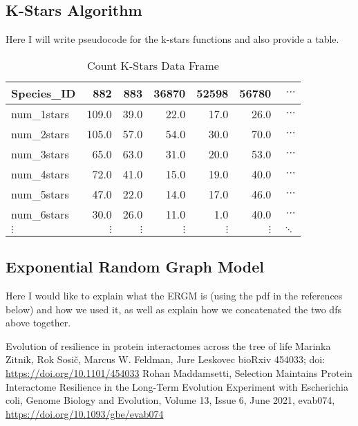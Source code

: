 \documentclass[12pt]{article}
\begin{document}
\subsection{K-Stars Algorithm}
Here I will write pseudocode for the k-stars functions and also provide a table. 
\begin{table}[H]
\centering
\caption{Count K-Stars Data Frame}
\begin{tabular}{lrrrrrr}
\toprule
Species\_ID &  882   &  883   &  36870 &  52598 &  56780 & $\cdots$\\
\midrule
num\_1stars &  109.0 &   39.0 &   22.0 &   17.0 &   26.0 & $\cdots$\\
num\_2stars &  105.0 &   57.0 &   54.0 &   30.0 &   70.0 & $\cdots$\\
num\_3stars &   65.0 &   63.0 &   31.0 &   20.0 &   53.0 & $\cdots$\\
num\_4stars &   72.0 &   41.0 &   15.0 &   19.0 &   40.0 & $\cdots$\\
num\_5stars &   47.0 &   22.0 &   14.0 &   17.0 &   46.0 & $\cdots$\\
num\_6stars &   30.0 &   26.0 &   11.0 &    1.0 &   40.0 & $\cdots$\\
$\vdots$ &   $\vdots$ &   $\vdots$ &   $\vdots$ &    $\vdots$ &   $\vdots$ & $\ddots$\\
\bottomrule
\end{tabular}
\end{table}
\subsection{Exponential Random Graph Model}
Here I would like to explain what the ERGM is (using the pdf in the references below)   and how we used it, as well as explain how we concatenated the two dfs above together.

\begin{thebibliography}{1}
  Evolution of resilience in protein interactomes across the tree of life
Marinka Zitnik, Rok Sosič, Marcus W. Feldman, Jure Leskovec
bioRxiv 454033; doi: \url{https://doi.org/10.1101/454033}
 Rohan Maddamsetti, Selection Maintains Protein Interactome Resilience in the Long-Term Evolution Experiment with Escherichia coli, Genome Biology and Evolution, Volume 13, Issue 6, June 2021, evab074, \url{https://doi.org/10.1093/gbe/evab074}
  \end{thebibliography}

\end{document}
